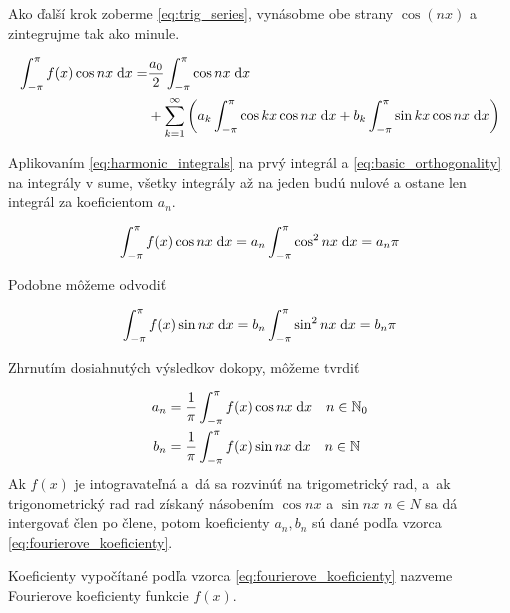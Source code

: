 Ako ďalší krok zoberme \eqref{eq:trig_series}, vynásobme obe strany
$\cos(nx)$ a zintegrujme tak ako minule.

\begin{equation*}
    \begin{split}
    \int_{-\pi}^{\pi} f(x) \cos nx  \; \mathrm{d} x =& \frac{a_0}{2} \int_{-\pi}^{\pi} \cos nx \; \mathrm{d} x 
    \\ &+
        \sum_{k=1}^{\infty} \left(
            a_k \int_{-\pi}^{\pi} \cos kx \cos nx \; \mathrm{d} x + 
            b_k \int_{-\pi}^{\pi} \sin kx \cos nx \; \mathrm{d} x
        \right)
    \end{split}
\end{equation*}

Aplikovaním \eqref{eq:harmonic_integrals} na prvý integrál a 
\eqref{eq:basic_orthogonality} na integrály v sume, všetky integrály
až na jeden budú nulové a ostane len integrál za koeficientom $a_n$.

\begin{equation*}
    \int_{-\pi}^{\pi} f(x) \cos nx \; \mathrm{d} x = a_n \int_{-\pi}^{\pi} \cos^2 nx \; \mathrm{d} x = a_n \pi
\end{equation*}

Podobne môžeme odvodiť

\begin{equation*}
    \int_{-\pi}^{\pi} f(x) \sin nx \; \mathrm{d} x = b_n \int_{-\pi}^{\pi} \sin^2 nx \; \mathrm{d} x = b_n \pi
\end{equation*}

Zhrnutím dosiahnutých výsledkov dokopy, môžeme tvrdiť

\begin{equation}
\begin{split}
    a_n &=  \frac{1}{\pi} \int_{-\pi}^{\pi} f(x) \cos n x \; \mathrm{d} x \quad n\in \mathbb{N}_0 \\
    b_n &=  \frac{1}{\pi} \int_{-\pi}^{\pi} f(x) \sin n x \; \mathrm{d} x \quad n\in \mathbb{N}
\end{split}    
    \label{eq:fourierove_koeficienty}
\end{equation}
Ak $f(x)$ je intogravateľná a~dá sa rozvinúť na
trigometrický rad, a~ak trigonometrický rad rad získaný násobením
$\cos nx$ a $\sin nx$ $n\in N$ sa dá intergovať člen po člene,
potom koeficienty $a_n, b_n$ sú dané podľa vzorca
\eqref{eq:fourierove_koeficienty}.

\begin{definicia}
    Koeficienty vypočítané podľa vzorca
    \eqref{eq:fourierove_koeficienty} nazveme Fourierove koeficienty
    funkcie $f(x)$.
\end{definicia}


